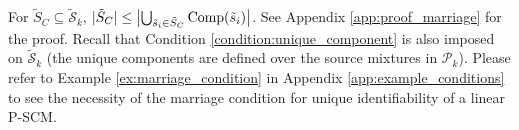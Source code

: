 \documentclass[12pt]{article}
\newcommand{\setS}{\mathcal{S}}
\newcommand{\bB}{\mathbf{B}}
\newcommand{\bW}{\mathbf{W}}
\begin{document}
For $\tilde{S}_C \subseteq \tilde{\setS}_k$, $|\tilde{S}_C| \leq \left| \bigcup_{\tilde{s}_i\in \tilde{S}_C} {\rm{Comp}}(\tilde{s}_i) \right|$. 
See Appendix \ref{app:proof_marriage} for the proof. 
Recall that Condition \ref{condition:unique_component} is also imposed on $\tilde{\mathcal{S}}_k$ (the unique components are defined over the source mixtures in $\mathcal{P}_k$). Please refer to Example \ref{ex:marriage_condition} in Appendix \ref{app:example_conditions} to see the necessity of the marriage condition for unique identifiability of a linear P-SCM.


\vspace{-2mm}
\end{document}
